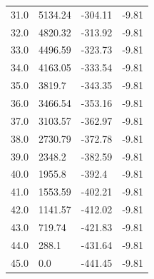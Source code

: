 \begin{table}[H]
\begin{tabular}{llll}
31.0 & 5134.24 & -304.11 & -9.81 \\
32.0 & 4820.32 & -313.92 & -9.81 \\
33.0 & 4496.59 & -323.73 & -9.81 \\
34.0 & 4163.05 & -333.54 & -9.81 \\
35.0 & 3819.7 & -343.35 & -9.81 \\
36.0 & 3466.54 & -353.16 & -9.81 \\
37.0 & 3103.57 & -362.97 & -9.81 \\
38.0 & 2730.79 & -372.78 & -9.81 \\
39.0 & 2348.2 & -382.59 & -9.81 \\
40.0 & 1955.8 & -392.4 & -9.81 \\
41.0 & 1553.59 & -402.21 & -9.81 \\
42.0 & 1141.57 & -412.02 & -9.81 \\
43.0 & 719.74 & -421.83 & -9.81 \\
44.0 & 288.1 & -431.64 & -9.81 \\
45.0 & 0.0 & -441.45 & -9.81 \\
\bottomrule
\end{tabular}

\end{table}
